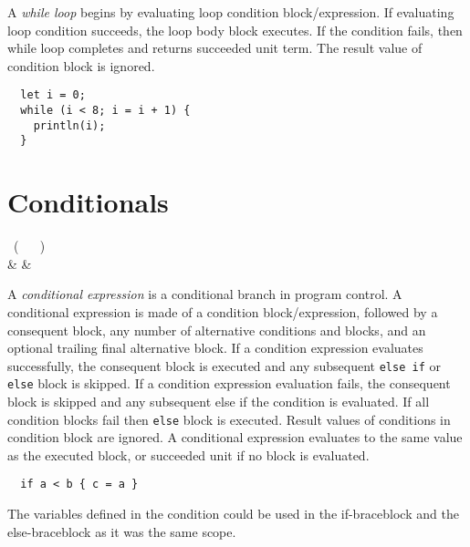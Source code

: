 A \emph{while loop} begins by evaluating loop condition block/expression. If evaluating loop condition succeeds, the loop body block executes. If the condition fails, then while loop completes and returns succeeded unit term. The result value of condition block is ignored.

\begin{example}
\begin{lstlisting}
  let i = 0;
  while (i < 8; i = i + 1) {
    println(i);
  }
\end{lstlisting}
\end{example}

\section{Conditionals}

\begin{bnf}
   \eq {} \ ( \  \gor {} \ ) \  \\
              & & 
\end{bnf}

A \emph{conditional expression} is a conditional branch in program control. A conditional expression is made of a condition block/expression, followed by a consequent block, any number of alternative conditions and blocks, and an optional trailing final alternative block. If a condition expression evaluates successfully, the consequent block is executed and any subsequent \lstinline{else if} or \lstinline{else} block is skipped. If a condition expression evaluation fails, the consequent block is skipped and any subsequent else if the condition is evaluated. If all condition blocks fail then \lstinline{else} block is executed. Result values of conditions in condition block are ignored. A conditional expression evaluates to the same value as the executed block, or succeeded unit if no block is evaluated.

\begin{example}
\begin{lstlisting}
  if a < b { c = a } 
\end{lstlisting}
\end{example}

The variables defined in the condition could be used in the if-braceblock and the else-braceblock as it was the same scope.

